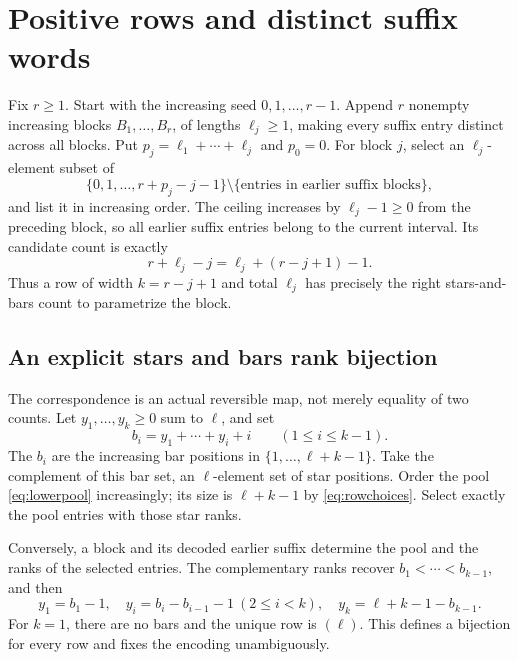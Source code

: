 \section{Positive rows and distinct suffix words}\label{sec:positive}
Fix $r\ge1$. Start with the increasing seed $0,1,\ldots,r-1$. Append $r$ nonempty increasing blocks $B_1,\ldots,B_r$, of lengths $\ell_j\ge1$, making every suffix entry distinct across all blocks. Put $p_j=\ell_1+\cdots+\ell_j$ and $p_0=0$. For block $j$, select an $\ell_j$-element subset of
\begin{equation}\label{eq:lowerpool}
 \{0,1,\ldots,r+p_j-j-1\}\setminus
       \{\text{entries in earlier suffix blocks}\},
\end{equation}
and list it in increasing order. The ceiling increases by $\ell_j-1\ge0$ from the preceding block, so all earlier suffix entries belong to the current interval. Its candidate count is exactly
\begin{equation}\label{eq:rowchoices}
 r+\ell_j-j=\ell_j+(r-j+1)-1.
\end{equation}
Thus a row of width $k=r-j+1$ and total $\ell_j$ has precisely the right stars-and-bars count to parametrize the block.

\subsection{An explicit stars and bars rank bijection}
The correspondence is an actual reversible map, not merely equality of two counts. Let $y_1,\ldots,y_k\ge0$ sum to $\ell$, and set
\[
 b_i=y_1+\cdots+y_i+i\qquad(1\le i\le k-1).
\]
The $b_i$ are the increasing bar positions in $\{1,\ldots,\ell+k-1\}$. Take the complement of this bar set, an $\ell$-element set of star positions. Order the pool \eqref{eq:lowerpool} increasingly; its size is $\ell+k-1$ by \eqref{eq:rowchoices}. Select exactly the pool entries with those star ranks.

Conversely, a block and its decoded earlier suffix determine the pool and the ranks of the selected entries. The complementary ranks recover $b_1<\cdots<b_{k-1}$, and then
\[
 y_1=b_1-1,\quad y_i=b_i-b_{i-1}-1\ (2\le i<k),\quad
 y_k=\ell+k-1-b_{k-1}.
\]
For $k=1$, there are no bars and the unique row is $(\ell)$. This defines a bijection for every row and fixes the encoding unambiguously.

